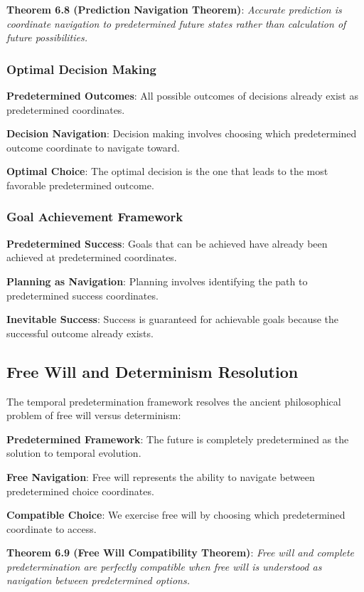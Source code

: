 \documentclass[12pt,a4paper]{article}
\theoremstyle{definition}
\begin{document}
{\textbf{Theorem 6.8 (Prediction Navigation Theorem)}: \textit{Accurate prediction is coordinate navigation to predetermined future states rather than calculation of future possibilities.}

\subsubsection{Optimal Decision Making}

\textbf{Predetermined Outcomes}: All possible outcomes of decisions already exist as predetermined coordinates.

\textbf{Decision Navigation}: Decision making involves choosing which predetermined outcome coordinate to navigate toward.

\textbf{Optimal Choice}: The optimal decision is the one that leads to the most favorable predetermined outcome.

\subsubsection{Goal Achievement Framework}

\textbf{Predetermined Success}: Goals that can be achieved have already been achieved at predetermined coordinates.

\textbf{Planning as Navigation}: Planning involves identifying the path to predetermined success coordinates.

\textbf{Inevitable Success}: Success is guaranteed for achievable goals because the successful outcome already exists.

\subsection{Free Will and Determinism Resolution}

The temporal predetermination framework resolves the ancient philosophical problem of free will versus determinism:

\textbf{Predetermined Framework}: The future is completely predetermined as the solution to temporal evolution.

\textbf{Free Navigation}: Free will represents the ability to navigate between predetermined choice coordinates.

\textbf{Compatible Choice}: We exercise free will by choosing which predetermined coordinate to access.

\textbf{Theorem 6.9 (Free Will Compatibility Theorem)}: \textit{Free will and complete predetermination are perfectly compatible when free will is understood as navigation between predetermined options.}

}
\end{document}
